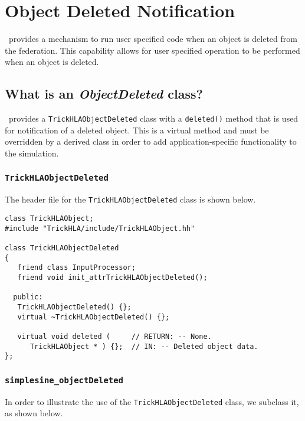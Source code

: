 \chapter{Object Deleted Notification}
\label{sec:hla-objDel}

\TrickHLA\ provides a mechanism to run user specified code when an object is 
deleted from the federation.  This capability allows for user specified 
operation to be performed when an object is deleted.

\section{What is an {\em ObjectDeleted} class?}

\TrickHLA\ provides a {\tt TrickHLAObjectDeleted} class with a {\tt deleted()} 
method that is used for notification of a deleted object.  This is a virtual 
method and must be overridden by a derived class in order to add 
application-specific functionality to the simulation.

\subsection{{\tt TrickHLAObjectDeleted}}

The header file for the {\tt TrickHLAObjectDeleted} class is shown below.

\begin{lstlisting}[caption={{\tt TrickHLAObjectDeleted} class header}]
class TrickHLAObject;
#include "TrickHLA/include/TrickHLAObject.hh"

class TrickHLAObjectDeleted
{
   friend class InputProcessor;
   friend void init_attrTrickHLAObjectDeleted();

  public:
   TrickHLAObjectDeleted() {};
   virtual ~TrickHLAObjectDeleted() {};

   virtual void deleted (     // RETURN: -- None.
      TrickHLAObject * ) {};  // IN: -- Deleted object data.
};
\end{lstlisting}

\subsection{{\tt simplesine\_objectDeleted}}

In order to illustrate the use of the {\tt TrickHLAObjectDeleted} class, we 
subclass it, as shown below.

